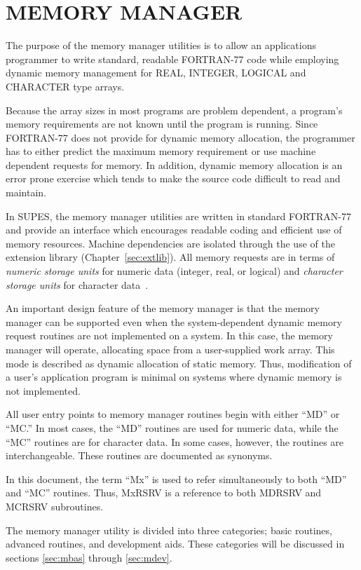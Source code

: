 \chapter{MEMORY MANAGER}
The purpose of the memory manager utilities is to allow an applications
programmer to write standard, readable FORTRAN-77 code while employing
dynamic memory management for REAL, INTEGER, LOGICAL and CHARACTER type
arrays.

Because the array sizes in most programs are problem dependent, a
program's memory requirements are not known until the program is running.
Since FORTRAN-77 does not provide for dynamic memory allocation, the
programmer has to either predict the maximum memory requirement or use
machine dependent requests for memory.  In addition, dynamic memory
allocation is an error prone exercise which tends to make the source code
difficult to read and maintain.

In SUPES, the memory manager utilities are written in standard FORTRAN-77
and provide an interface which encourages readable coding and efficient use
of memory resources.  Machine dependencies are isolated through the use of
the extension library (Chapter~\ref{sec:extlib}). All memory
requests are in terms of {\em numeric storage units} for numeric data
(integer, real, or logical) and {\em character storage units} for
character data~\cite{ansi}.

An important design feature of the memory manager is that the memory manager
can be supported even when the system-dependent dynamic memory request
routines are not implemented on a system.  In this case, the memory manager
will operate, allocating space from a user-supplied work array.  This mode
is described as dynamic allocation of static memory. Thus, modification of a
user's application program is minimal on systems where dynamic memory is not
implemented. 

All user entry points to memory manager routines begin with either ``MD''
or ``MC.'' In most cases, the ``MD'' routines are used for numeric data,
while the ``MC'' routines are for character data. In some cases, however,
the routines are interchangeable. These routines are documented as synonyms.

In this document, the term ``Mx'' is used to refer simultaneously to
both ``MD'' and ``MC'' routines. Thus, MxRSRV is a reference to both MDRSRV
and MCRSRV subroutines.

The memory manager utility is divided into three categories; basic routines,
advanced routines, and development aids.  These categories will be discussed
in sections \ref{sec:mbas} through \ref{sec:mdev}.


